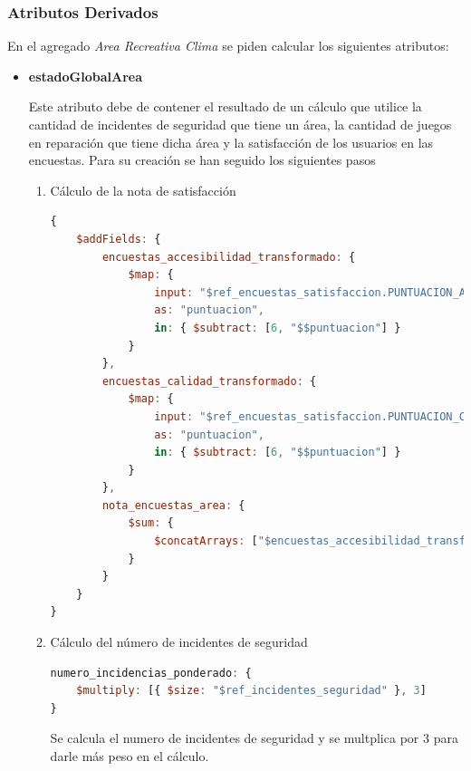 \documentclass[]{article}
\begin{document}
\subsubsection{Atributos Derivados}
\label{subsubsec:derivados_area}

En el agregado \textit{Area Recreativa Clima} se piden calcular los siguientes atributos:
\begin{itemize}
    \item \textbf{estadoGlobalArea}
    
    Este atributo debe de contener el resultado de un cálculo que utilice la cantidad de incidentes de seguridad que tiene un área, la cantidad de juegos en reparación que tiene dicha área y la satisfacción de los usuarios en las encuestas. Para su creación se han seguido los siguientes pasos
    \begin{enumerate}
        \item Cálculo de la nota de satisfacción
        
        \begin{lstlisting}[language=JavaScript, caption=Calculo del campo nota\_encuestas\_areas]
{
    $addFields: {
        encuestas_accesibilidad_transformado: {
            $map: {
                input: "$ref_encuestas_satisfaccion.PUNTUACION_ACCESIBILIDAD",
                as: "puntuacion",
                in: { $subtract: [6, "$$puntuacion"] }
            }
        },
        encuestas_calidad_transformado: {
            $map: {
                input: "$ref_encuestas_satisfaccion.PUNTUACION_CALIDAD",
                as: "puntuacion",
                in: { $subtract: [6, "$$puntuacion"] }
            }
        },
        nota_encuestas_area: {
            $sum: {
                $concatArrays: ["$encuestas_accesibilidad_transformado", "$encuestas_calidad_transformado"]
            }
        }
    }
}

        \end{lstlisting}

        \item Cálculo del número de incidentes de seguridad
        
        \begin{lstlisting}[language=JavaScript, caption=Ponderación del número de incidencias]
numero_incidencias_ponderado: {
    $multiply: [{ $size: "$ref_incidentes_seguridad" }, 3]
}
        \end{lstlisting}

        Se calcula el numero de incidentes de seguridad y se multplica por 3 para darle más peso en el cálculo.


\end{enumerate}
\end{itemize}
\end{document}
